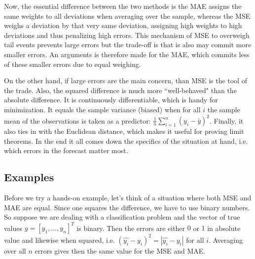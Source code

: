 \documentclass[english, a4paper]{article}
\begin{document}
Now, the essential difference between the two methods is the MAE assigns the same weights to all deviations when averaging over the sample, whereas the MSE weighs a deviation by that very same deviation, assigning high weights to high deviations and thus penalizing high errors. This mechanism of MSE to overweigh tail events prevents large errors but the trade-off is that is also may commit more smaller errors. An arguments is therefore made for the MAE, which commits less of these smaller errors due to equal weighing.

On the other hand, if large errors are the main concern, than MSE is the tool of the trade. Also, the squared difference is much more ``well-behaved" than the absolute difference. It is continuously differentiable, which is handy for minimization. It equals the sample variance (biased) when for all $i$ the sample mean of the observations is taken as a predictor: $\frac{1}{n}\sum_{i=1}^{n}( y_{i} - \bar{y})^{2}$. Finally, it also ties in with the Euclidean distance, which makes it useful for proving limit theorems. In the end it all comes down the specifics of the situation at hand, i.e. which errors in the forecast matter most.

\subsection{Examples}
Before we try a hands-on example, let's think of a situation where both MSE and MAE are equal. Since one squares the difference, we have to use binary numbers. So suppose we are dealing with a classification problem and the vector of true values $y=[y_{1},\dots,y_{n}]^{T}$ is binary. Then the errors are either $0$ or $1$ in absolute value and likewise when squared, i.e. $(\hat{y_{i}} - y_{i})^{2}=|\hat{y_{i}}-y_{i}|$ for all $i$. Averaging over all $n$ errors gives then the same value for the MSE and MAE.

 
  

          


\end{document}
